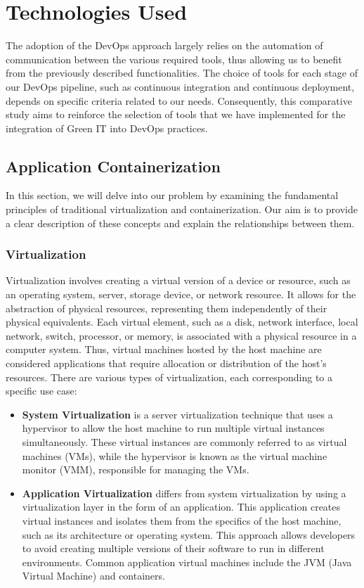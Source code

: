 \chapter{Technologies Used}
\label{chap:Chapter 3 title}
The adoption of the DevOps approach largely relies on the automation of communication between the various required tools, thus allowing us to benefit from the previously described functionalities. The choice of tools for each stage of our DevOps pipeline, such as continuous integration and continuous deployment, depends on specific criteria related to our needs. Consequently, this comparative study aims to reinforce the selection of tools that we have implemented for the integration of Green IT into DevOps practices.

\newpage


\section{Application Containerization}
In this section, we will delve into our problem by examining the fundamental principles of traditional virtualization and containerization. Our aim is to provide a clear description of these concepts and explain the relationships between them.

\subsection{Virtualization}
Virtualization involves creating a virtual version of a device or resource, such as an operating system, server, storage device, or network resource. It allows for the abstraction of physical resources, representing them independently of their physical equivalents. Each virtual element, such as a disk, network interface, local network, switch, processor, or memory, is associated with a physical resource in a computer system. Thus, virtual machines hosted by the host machine are considered applications that require allocation or distribution of the host's resources. There are various types of virtualization, each corresponding to a specific use case:

\begin{itemize}
    \item \textbf{System Virtualization} is a server virtualization technique that uses a hypervisor to allow the host machine to run multiple virtual instances simultaneously. These virtual instances are commonly referred to as virtual machines (VMs), while the hypervisor is known as the virtual machine monitor (VMM), responsible for managing the VMs.
    \item \textbf{Application Virtualization} differs from system virtualization by using a virtualization layer in the form of an application. This application creates virtual instances and isolates them from the specifics of the host machine, such as its architecture or operating system. This approach allows developers to avoid creating multiple versions of their software to run in different environments. Common application virtual machines include the JVM (Java Virtual Machine) and containers.
\end{itemize}


